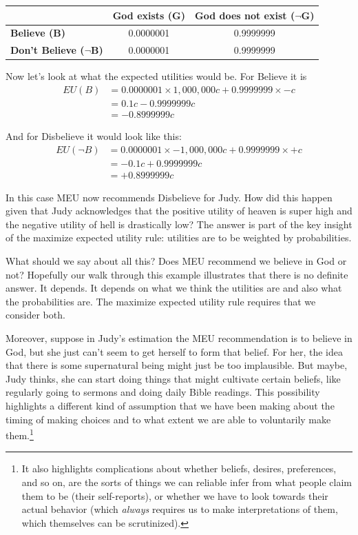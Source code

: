 \documentclass[]{tufte-book}
\begin{document}
\begin{longtable}[]{@{}lcc@{}}
\toprule
& God exists (G) & God does not exist (\(\neg\)G)\tabularnewline
\midrule
\endhead
\textbf{Believe (B)} & 0.0000001 & 0.9999999\tabularnewline
\textbf{Don't Believe (\(\neg\)B)} & 0.0000001 & 0.9999999\tabularnewline
\bottomrule
\end{longtable}

Now let's look at what the expected utilities would be. For Believe it is
\[
\begin{split}
EU(B)&= 0.0000001 \times 1,000,000c + 0.9999999 \times -c \\
&= 0.1c - 0.9999999c \\
&= -0.8999999c
\end{split}
\]

And for Disbelieve it would look like this:
\[
\begin{split}
EU(\neg B)&= 0.0000001 \times -1,000,000c + 0.9999999 \times +c \\
&= -0.1c + 0.9999999c \\
&= +0.8999999c
\end{split}
\]

In this case MEU now recommends Disbelieve for Judy. How did this happen given that Judy acknowledges that the positive utility of heaven is super high and the negative utility of hell is drastically low? The answer is part of the key insight of the maximize expected utility rule: utilities are to be weighted by probabilities.

What should we say about all this? Does MEU recommend we believe in God or not? Hopefully our walk through this example illustrates that there is no definite answer. It depends. It depends on what we think the utilities are and also what the probabilities are. The maximize expected utility rule requires that we consider both.

Moreover, suppose in Judy's estimation the MEU recommendation is to believe in God, but she just can't seem to get herself to form that belief. For her, the idea that there is some supernatural being might just be too implausible. But maybe, Judy thinks, she can start doing things that might cultivate certain beliefs, like regularly going to sermons and doing daily Bible readings. This possibility highlights a different kind of assumption that we have been making about the timing of making choices and to what extent we are able to voluntarily make them.\footnote{It also highlights complications about whether beliefs, desires, preferences, and so on, are the sorts of things we can reliable infer from what people claim them to be (their self-reports), or whether we have to look towards their actual behavior (which \emph{always} requires us to make interpretations of them, which themselves can be scrutinized).}
\end{document}
